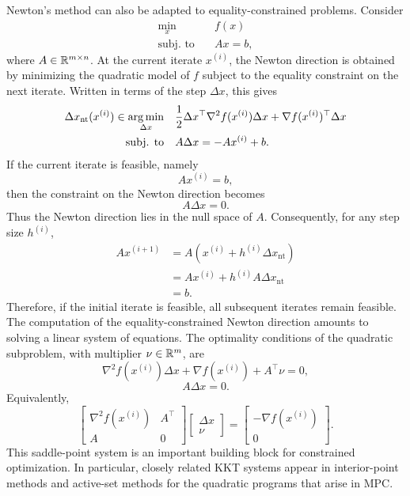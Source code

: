 Newton's method can also be adapted to equality-constrained problems. Consider
\[
\begin{aligned}
    \min_x \quad & f(x)\\
    \text{subj. to}\quad & Ax=b,
\end{aligned}
\]
where \(A\in\mathbb{R}^{m\times n}\). At the current iterate \(x^{(i)}\), the Newton direction is obtained
by minimizing the quadratic model of \(f\) subject to the equality constraint on the next
iterate. Written in terms of the step \(\Delta x\), this gives
\[
\begin{aligned}
    \Delta x_{\mathrm{nt}}(x^{(i)})
    \in
    \operatorname*{arg\,min}_{\Delta x}\quad
    &
    \frac{1}{2}
    \Delta x^\top
    \nabla^2 f(x^{(i)})
    \Delta x
    +
    \nabla f(x^{(i)})^\top \Delta x
    \\
    \text{subj. to}\quad
    &
    A\Delta x=-Ax^{(i)}+b.
\end{aligned}
\]
If the current iterate is feasible, namely
\[
    Ax^{(i)}=b,
\]
then the constraint on the Newton direction becomes
\[
    A\Delta x=0.
\]
Thus the Newton direction lies in the null space of \(A\). Consequently, for any step size
\(h^{(i)}\),
\[
\begin{aligned}
    Ax^{(i+1)}
    &=
    A\left(x^{(i)}+h^{(i)}\Delta x_{\mathrm{nt}}\right)\\
    &=
    Ax^{(i)}+h^{(i)}A\Delta x_{\mathrm{nt}}\\
    &=
    b.
\end{aligned}
\]
Therefore, if the initial iterate is feasible, all subsequent iterates remain feasible.\\
The computation of the equality-constrained Newton direction amounts to solving a linear
system of equations. The optimality conditions of the quadratic subproblem, with multiplier
\(\nu\in\mathbb{R}^m\), are
\[
    \nabla^2 f(x^{(i)})\Delta x
    +
    \nabla f(x^{(i)})
    +
    A^\top \nu
    =
    0,
\]
\[
    A\Delta x=0.
\]
Equivalently,
\[
    \begin{bmatrix}
        \nabla^2 f(x^{(i)}) & A^\top\\
        A & 0
    \end{bmatrix}
    \begin{bmatrix}
        \Delta x\\
        \nu
    \end{bmatrix}
    =
    \begin{bmatrix}
        -\nabla f(x^{(i)})\\
        0
    \end{bmatrix}.
\]
This saddle-point system is an important building block for constrained optimization. In
particular, closely related KKT systems appear in interior-point methods and active-set methods
for the quadratic programs that arise in MPC.

